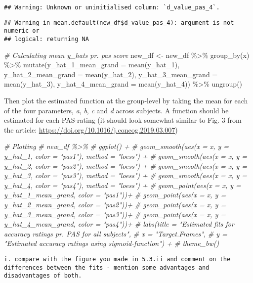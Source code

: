 \documentclass[
]{article}
\newenvironment{Shaded}{\begin{snugshade}}{\end{snugshade}}
\newcommand{\AttributeTok}[1]{\textcolor[rgb]{0.77,0.63,0.00}{#1}}
\newcommand{\CommentTok}[1]{\textcolor[rgb]{0.56,0.35,0.01}{\textit{#1}}}
\newcommand{\FunctionTok}[1]{\textcolor[rgb]{0.00,0.00,0.00}{#1}}
\newcommand{\NormalTok}[1]{#1}
\newcommand{\OtherTok}[1]{\textcolor[rgb]{0.56,0.35,0.01}{#1}}
\newcommand{\SpecialCharTok}[1]{\textcolor[rgb]{0.00,0.00,0.00}{#1}}
\begin{document}
\begin{verbatim}
## Warning: Unknown or uninitialised column: `d_value_pas_4`.
\end{verbatim}

\begin{verbatim}
## Warning in mean.default(new_df$d_value_pas_4): argument is not numeric or
## logical: returning NA
\end{verbatim}

\begin{Shaded}
\begin{Highlighting}[]
\CommentTok{\# Calculating mean y\_hats pr. pas score}
\NormalTok{new\_df }\OtherTok{\textless{}{-}}\NormalTok{ new\_df }\SpecialCharTok{\%\textgreater{}\%} 
  \FunctionTok{group\_by}\NormalTok{(x) }\SpecialCharTok{\%\textgreater{}\%} 
  \FunctionTok{mutate}\NormalTok{(}\AttributeTok{y\_hat\_1\_mean\_grand =} \FunctionTok{mean}\NormalTok{(y\_hat\_1),}
       \AttributeTok{y\_hat\_2\_mean\_grand =} \FunctionTok{mean}\NormalTok{(y\_hat\_2),}
       \AttributeTok{y\_hat\_3\_mean\_grand =} \FunctionTok{mean}\NormalTok{(y\_hat\_3),}
       \AttributeTok{y\_hat\_4\_mean\_grand =} \FunctionTok{mean}\NormalTok{(y\_hat\_4)) }\SpecialCharTok{\%\textgreater{}\%} 
  \FunctionTok{ungroup}\NormalTok{()}
\end{Highlighting}
\end{Shaded}

Then plot the estimated function at the group-level by taking the mean
for each of the four parameters, \emph{a}, \emph{b}, \emph{c} and
\emph{d} across subjects. A function should be estimated for each
PAS-rating (it should look somewhat similar to Fig. 3 from the article:
\url{https://doi.org/10.1016/j.concog.2019.03.007})

\begin{Shaded}
\begin{Highlighting}[]
\CommentTok{\# Plotting }
\CommentTok{\# new\_df \%\textgreater{}\% }
\CommentTok{\#   ggplot() + }
\CommentTok{\#   geom\_smooth(aes(x = x, y = y\_hat\_1, color = "pas1"), method = "loess") + }
\CommentTok{\#   geom\_smooth(aes(x = x, y = y\_hat\_2, color = "pas2"), method = "loess") + }
\CommentTok{\#   geom\_smooth(aes(x = x, y = y\_hat\_3, color = "pas3"), method = "loess") + }
\CommentTok{\#   geom\_smooth(aes(x = x, y = y\_hat\_4, color = "pas4"), method = "loess") +}
\CommentTok{\#   geom\_point(aes(x = x, y = y\_hat\_1\_mean\_grand, color = "pas1"))+}
\CommentTok{\#   geom\_point(aes(x = x, y = y\_hat\_2\_mean\_grand, color = "pas2"))+}
\CommentTok{\#   geom\_point(aes(x = x, y = y\_hat\_3\_mean\_grand, color = "pas3"))+}
\CommentTok{\#   geom\_point(aes(x = x, y = y\_hat\_4\_mean\_grand, color = "pas4"))+}
\CommentTok{\#   labs(title = "Estimated fits for accuracy ratings pr. PAS for all subjects",}
\CommentTok{\#        x = "Target.Frames",}
\CommentTok{\#        y = "Estimated accuracy ratings using sigmoid{-}function") +}
\CommentTok{\#   theme\_bw()}
\end{Highlighting}
\end{Shaded}

\begin{verbatim}
i. compare with the figure you made in 5.3.ii and comment on the differences between the fits - mention some advantages and disadvantages of both.
\end{verbatim}
\end{document}
